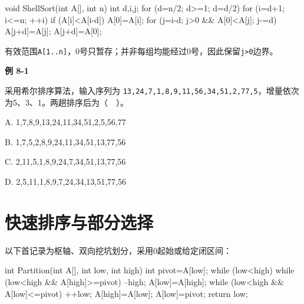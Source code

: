 \par\smallskip\noindent\begin{minipage}{\linewidth}
\begin{codeblock}[language={C++}]
void ShellSort(int A[], int n) {
    int d,i,j;
    for (d=n/2; d>=1; d=d/2)
        for (i=d+1; i<=n; ++i)
            if (A[i]<A[i-d]) {
                A[0]=A[i];
                for (j=i-d; j>0 && A[0]<A[j]; j-=d)
                    A[j+d]=A[j];
                A[j+d]=A[0];
            }
}
\end{codeblock}
\end{minipage}\par\smallskip

有效范围\texttt{A[\allowbreak{}1.\allowbreak{}.\allowbreak{}n]\allowbreak{}}，0号只暂存；并非每组均能经过0号，因此保留\texttt{j>\allowbreak{}0}边界。

\par\medskip{}\noindent\hypertarget{DS08-E01}{}\label{DS08-E01}\textbf{例 8-1}\par\nobreak\smallskip

采用希尔排序算法，输入序列为 \texttt{13,\allowbreak{}24,\allowbreak{}7,\allowbreak{}1,\allowbreak{}8,\allowbreak{}9,\allowbreak{}11,\allowbreak{}56,\allowbreak{}34,\allowbreak{}51,\allowbreak{}2,\allowbreak{}77,\allowbreak{}5}，增量依次为5、3、1。两趟排序后为（　）。

A. 1,7,8,9,13,24,11,34,51,2,5,56,77

B. 1,7,5,2,8,9,24,11,34,51,13,77,56

C. 2,11,5,1,8,9,24,7,34,51,13,77,56

D. 2,5,11,1,8,9,7,24,34,13,51,77,56

\section{快速排序与部分选择}\label{DS08-quick}

以下首记录为枢轴、双向挖坑划分，采用0起始或给定闭区间：

\par\smallskip\noindent\begin{minipage}{\linewidth}
\begin{codeblock}[language={C++}]
int Partition(int A[], int low, int high) {
    int pivot=A[low];
    while (low<high) {
        while (low<high && A[high]>=pivot) --high;
        A[low]=A[high];
        while (low<high && A[low]<=pivot) ++low;
        A[high]=A[low];
    }
    A[low]=pivot;
    return low;
}
\end{codeblock}
\end{minipage}\par\smallskip

